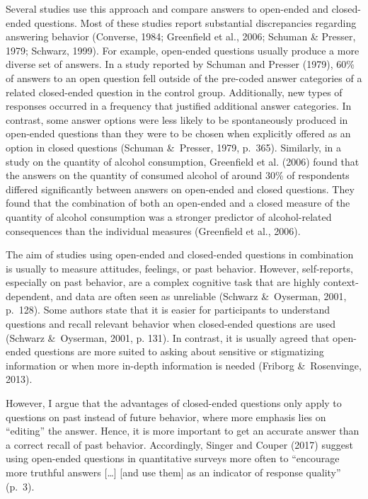 \documentclass{article}
\begin{document}
Several studies use this approach and compare answers to open-ended and closed-ended questions. Most of these studies report substantial discrepancies regarding answering behavior (Converse, 1984; Greenfield et al., 2006; Schuman \& Presser, 1979; Schwarz, 1999). For example, open-ended questions usually produce a more diverse set of answers. In a study reported by Schuman and Presser (1979), 60\% of answers to an open question fell outside of the pre-coded answer categories of a related closed-ended question in the control group. Additionally, new types of responses occurred in a frequency that justified additional answer categories. In contrast, some answer options were less likely to be spontaneously produced in open-ended questions than they were to be chosen when explicitly offered as an option in closed questions (Schuman \& Presser, 1979, p. 365). Similarly, in a study on the quantity of alcohol consumption, Greenfield et al. (2006) found that the answers on the quantity of consumed alcohol of around 30\% of respondents differed significantly between answers on open-ended and closed questions. They found that the combination of both an open-ended and a closed measure of the quantity of alcohol consumption was a stronger predictor of alcohol-related consequences than the individual measures (Greenfield et al., 2006).

The aim of studies using open-ended and closed-ended questions in combination is usually to measure attitudes, feelings, or past behavior. However, self-reports, especially on past behavior, are a complex cognitive task that are highly context-dependent, and data are often seen as unreliable (Schwarz \& Oyserman, 2001, p. 128). Some authors state that it is easier for participants to understand questions and recall relevant behavior when closed-ended questions are used (Schwarz \& Oyserman, 2001, p. 131). In contrast, it is usually agreed that open-ended questions are more suited to asking about sensitive or stigmatizing information or when more in-depth information is needed (Friborg \& Rosenvinge, 2013).

However, I argue that the advantages of closed-ended questions only apply to questions on past instead of future behavior, where more emphasis lies on “editing” the answer. Hence, it is more important to get an accurate answer than a correct recall of past behavior. Accordingly, Singer and Couper (2017) suggest using open-ended questions in quantitative surveys more often to “encourage more truthful answers […] [and use them] as an indicator of response quality” (p. 3).
\end{document}
